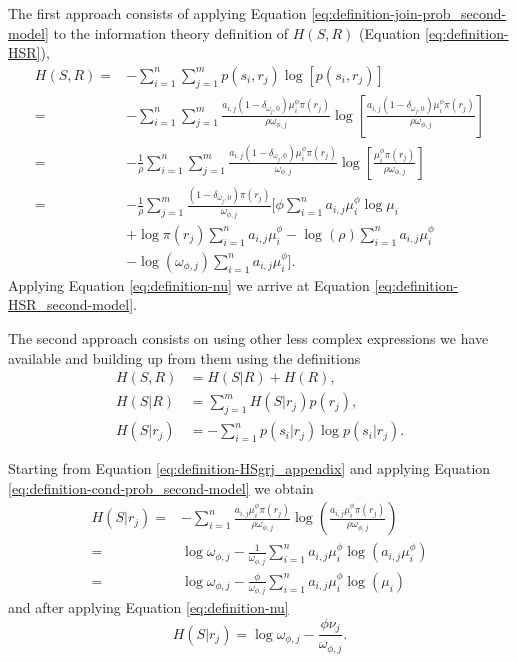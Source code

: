 The first approach consists of applying Equation \eqref{eq:definition-join-prob_second-model} to the information theory definition of $H(S,R)$ (Equation \eqref{eq:definition-HSR}),
\begin{align*}
  H(S,R) =& - \sum_{i=1}^n \sum_{j=1}^m p(s_i, r_j) \log \left[ p(s_i, r_j) \right] \\
         =& - \sum_{i=1}^n \sum_{j=1}^m \frac{a_{i,j} (1 - \delta_{\omega_j,0}) \mu_i^\phi \pi(r_j)}{\rho \omega_{\phi,j}} \log \left[ \frac{a_{i,j} (1 - \delta_{\omega_j,0}) \mu_i^\phi \pi(r_j)}{\rho \omega_{\phi,j}} \right] \\
         =& - \frac{1}{\rho} \sum_{i=1}^n \sum_{j=1}^m \frac{a_{i,j} (1 - \delta_{\omega_j,0}) \mu_i^\phi \pi(r_j)}{\omega_{\phi,j}} \log \left[ \frac{\mu_i^\phi \pi(r_j)}{\rho \omega_{\phi,j}} \right] \\
         =& - \frac{1}{\rho} \sum_{j=1}^m \frac{(1 - \delta_{\omega_j,0}) \pi(r_j)}{\omega_{\phi,j}} \Bigg[ \phi \sum_{i=1}^n a_{i,j} \mu_i^\phi \log \mu_i \\
          & + \log \pi(r_j) \sum_{i=1}^n a_{i,j} \mu_i^\phi - \log(\rho) \sum_{i=1}^n a_{i,j} \mu_i^\phi \\
          & - \log(\omega_{\phi,j}) \sum_{i=1}^n a_{i,j} \mu_i^\phi \Bigg].
\end{align*}
Applying Equation \eqref{eq:definition-nu} we arrive at Equation \eqref{eq:definition-HSR_second-model}.

The second approach consists on using other less complex expressions we have available and building up from them using the definitions
\begin{align}
  \label{eq:definition-HSR_appendix}
  H(S,R) &= H(S|R) + H(R), \\
  \label{eq:definition-HSgR_appendix}
  H(S|R) &= \sum_{j=1}^m H(S|r_j)p(r_j), \\
  \label{eq:definition-HSgrj_appendix}
  H(S|r_j) &= -\sum_{i=1}^n p(s_i|r_j) \log p(s_i|r_j).
\end{align}

Starting from Equation \eqref{eq:definition-HSgrj_appendix} and applying Equation \eqref{eq:definition-cond-prob_second-model} we obtain
\begin{align*}
  H(S|r_j) =& -\sum_{i=1}^n \frac{a_{i,j} \mu_i^\phi \pi(r_j)}{\rho \omega_{\phi,j}} \log \left( \frac{a_{i,j} \mu_i^\phi \pi(r_j)}{\rho \omega_{\phi,j}} \right) \\
           =& \log \omega_{\phi,j} - \frac{1}{\omega_{\phi,j}} \sum_{i=1}^n a_{i,j} \mu_i^\phi \log(a_{i,j} \mu_i^\phi) \\
           =& \log \omega_{\phi,j} - \frac{\phi}{\omega_{\phi,j}} \sum_{i=1}^n a_{i,j} \mu_i^\phi \log(\mu_i)
\end{align*}
and after applying Equation \eqref{eq:definition-nu}
\begin{equation}
  \label{eq:definition-HSgrj_appendix-step}
  H(S|r_j) = \log \omega_{\phi,j} - \frac{\phi \nu_j}{\omega_{\phi,j}}.
\end{equation}


